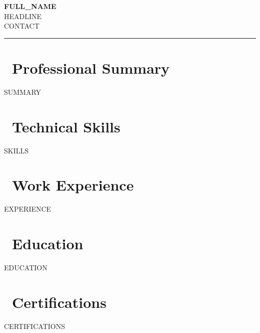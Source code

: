 \documentclass[10pt, letterpaper]{article}
\begin{document}
\begin{center}
  {\fontsize{19}{22}\bfseries\color{textmain} \MakeUppercase{{{FULL_NAME}}}}\\[2pt]
  {\fontsize{9.5}{11}\color{accent} {{HEADLINE}}}\\[4pt]
{{CONTACT}}
\end{center}
\vspace{-2pt}
\textcolor{accent}{\rule{\linewidth}{1pt}}

\section{\faUser\ Professional Summary}
{\fontsize{8.4}{11}\color{textmain}
{{SUMMARY}}}

\section{\faCogs\ Technical Skills}
\vspace{2pt}
{{SKILLS}}
\section{\faBriefcase\ Work Experience}
{{EXPERIENCE}}

\section{\faGraduationCap\ Education}
{{EDUCATION}}

\section{\faCertificate\ Certifications}
{{CERTIFICATIONS}}
\end{document}
